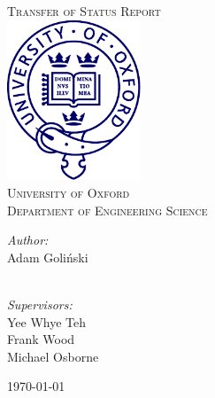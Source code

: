 
\begin{titlepage}
\begin{center}

~\\[2cm]

\textsc{\LARGE Transfer of Status Report}\\[2cm]

\includegraphics[width=0.3\textwidth]{title/oxford.pdf}\\[2cm]

\textsc{\Large University of Oxford}\\
\textsc{\Large Department of Engineering Science}\\[2cm]


\begin{minipage}{0.4\textwidth}
\begin{flushleft} \large
\emph{Author:}\\
Adam Goli\'{n}ski\\
\text{}\\
\text{}
\end{flushleft}
\end{minipage}
\begin{minipage}{0.4\linewidth}
\begin{flushright} \large
\emph{Supervisors:} \\

Yee Whye Teh \\
Frank Wood \\
Michael Osborne
\end{flushright}
\end{minipage}

\vfill

{\large \today}

\end{center}
\end{titlepage}
